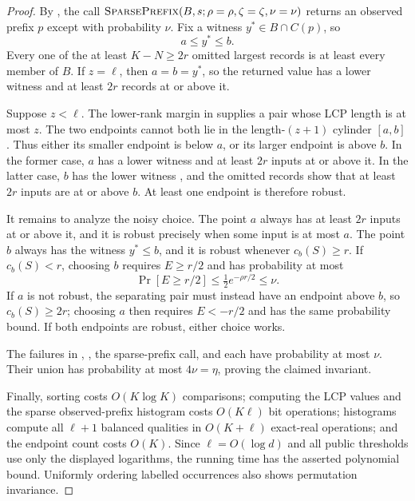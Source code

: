 \documentclass[11pt]{article}
\begin{document}
\begin{proof}
By , the call
$\text{\textsc{SparsePrefix}}(B,s;\rho=\rho,\zeta=\zeta,\nu=\nu)$ returns an observed prefix $p$
except with probability $\nu$.  Fix a witness
$y^*\in B\cap C(p)$, so
\begin{equation}
 a\le y^*\le b.
 \label{eq:cylinder-witness}
\end{equation}
Every one of the at least $K-N\ge2r$ omitted largest records is at least
every member of $B$.  If $z=\ell$, then $a=b=y^*$, so the returned value has
a lower witness and at least $2r$ records at or above it.

Suppose $z<\ell$.  The lower-rank margin in
 supplies a pair whose LCP length is at most $z$.
The two endpoints cannot both lie in the length-$(z+1)$ cylinder $[a,b]$.
Thus either its smaller endpoint is below $a$, or its larger endpoint is
above $b$.  In the former case, $a$ has a lower witness and at least $2r$
inputs at or above it.  In the latter case, $b$ has the lower witness
, and the omitted records show that at least
$2r$ inputs are at or above $b$.  At least one endpoint is therefore robust.

It remains to analyze the noisy choice.  The point $a$ always has at least
$2r$ inputs at or above it, and it is robust precisely when some input is at
most $a$.  The point $b$ always has the witness $y^*\le b$, and it is robust
whenever $c_b(S)\ge r$.  If $c_b(S)<r$, choosing $b$ requires
$E\ge r/2$ and has probability at most
\begin{equation}
 \Pr[E\ge r/2]\le\tfrac12e^{-\rho r/2}\le\nu.
 \label{eq:noisy-endpoint-failure}
\end{equation}
If $a$ is not robust, the separating pair must instead have an endpoint
above $b$, so $c_b(S)\ge2r$; choosing $a$ then requires $E<-r/2$ and has the
same probability bound.  If both endpoints are robust, either choice works.

The failures in ,
, the sparse-prefix call, and
 each have probability at most $\nu$.
Their union has probability at most $4\nu=\eta$, proving the claimed
invariant.

Finally, sorting costs $O(K\log K)$ comparisons; computing the LCP values
and the sparse observed-prefix histogram costs $O(K\ell)$ bit operations;
histograms compute all $\ell+1$ balanced qualities in $O(K+\ell)$
exact-real operations; and the endpoint count costs $O(K)$.  Since
$\ell=O(\log d)$ and all public thresholds use only the displayed
logarithms, the running time has the asserted polynomial bound.  Uniformly
ordering labelled occurrences also shows permutation invariance.
\end{proof}
\end{document}
